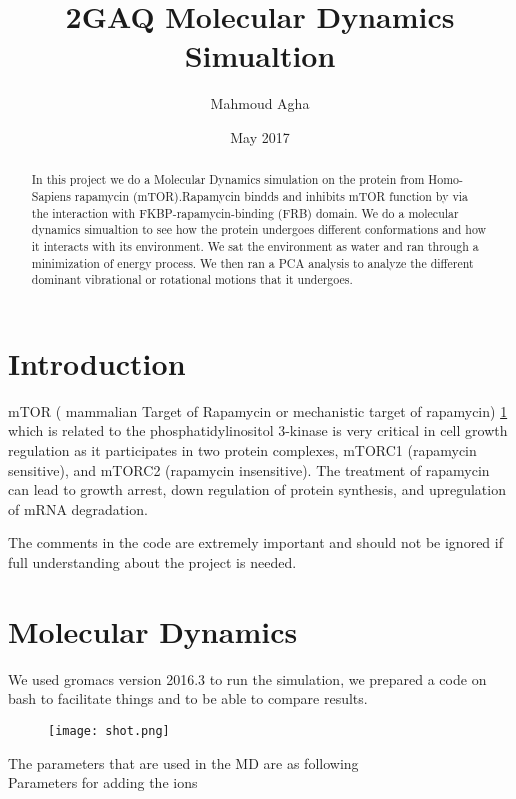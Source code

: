 \documentclass{article}
\title{2GAQ Molecular Dynamics Simualtion}
\author{Mahmoud Agha}
\date{May 2017}
\begin{document}
\maketitle
\begin{abstract}
    In this project we do a Molecular Dynamics simulation on the protein from Homo-Sapiens rapamycin (mTOR).Rapamycin bindds and inhibits mTOR function by via the interaction with FKBP-rapamycin-binding (FRB) domain. We do a molecular dynamics simualtion to see how the protein undergoes different conformations and how it interacts with its environment. We sat the environment as water and ran through a minimization of energy process. We then ran a PCA analysis to analyze the different dominant vibrational or rotational motions that it undergoes.
\end{abstract}

\section{Introduction}
mTOR ( mammalian Target of Rapamycin or mechanistic target of rapamycin) \cref{fig:shot} which is related to the phosphatidylinositol 3-kinase is very critical in cell growth regulation as it participates in two protein complexes, mTORC1 (rapamycin sensitive), and mTORC2 (rapamycin insensitive). The treatment of rapamycin can lead to growth arrest, down regulation of protein synthesis, and upregulation of mRNA degradation.


The comments in the code are extremely important and should not be ignored if full understanding about the project is needed.
\section{Molecular Dynamics}
We used gromacs version 2016.3 to run the simulation, we prepared a code on bash to facilitate things and to be able to compare results.

\begin{figure}[H]
          \centering
          \texttt{[image: shot.png]}
          \label{fig:shot}
\end{figure}




The parameters that are used in the MD are as following \\
Parameters for adding the ions

 
\end{document}
